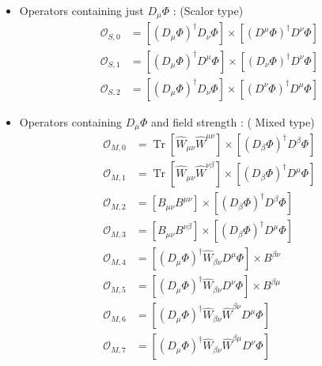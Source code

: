 \begin{itemize}
\item Operators containing just $D_\mu \Phi$ : (Scalor type)
\begin{equation}
\label{eq:OpratorFS}
\begin{aligned}
\mathcal{O}_{S, 0} &=\left[\left(D_{\mu} \Phi\right)^{\dagger} D_{\nu} \Phi\right] \times\left[\left(D^{\mu} \Phi\right)^{\dagger} D^{\nu} \Phi\right] \\
\mathcal{O}_{S, 1} &=\left[\left(D_{\mu} \Phi\right)^{\dagger} D^{\mu} \Phi\right] \times\left[\left(D_{\nu} \Phi\right)^{\dagger} D^{\nu} \Phi\right] \\
\mathcal{O}_{S, 2} &=\left[\left(D_{\mu} \Phi\right)^{\dagger} D_{\nu} \Phi\right] \times\left[\left(D^{\nu} \Phi\right)^{\dagger} D^{\mu} \Phi\right]
\end{aligned}
\end{equation}
\item Operators containing $D_\mu \Phi$ and field strength : ( Mixed type)
\begin{equation}
\label{eq:OpratorFM}
\begin{aligned}
\mathcal{O}_{M, 0} &=\operatorname{Tr}\left[\hat{W}_{\mu \nu} \hat{W}^{\mu \nu}\right] \times\left[\left(D_{\beta} \Phi\right)^{\dagger} D^{\beta} \Phi\right] \\
\mathcal{O}_{M, 1} &=\operatorname{Tr}\left[\hat{W}_{\mu \nu} \hat{W}^{\nu \beta}\right] \times\left[\left(D_{\beta} \Phi\right)^{\dagger} D^{\mu} \Phi\right] \\
\mathcal{O}_{M, 2} &=\left[B_{\mu \nu} B^{\mu \nu}\right] \times\left[\left(D_{\beta} \Phi\right)^{\dagger} D^{\beta} \Phi\right] \\
\mathcal{O}_{M, 3} &=\left[B_{\mu \nu} B^{\nu \beta}\right] \times\left[\left(D_{\beta} \Phi\right)^{\dagger} D^{\mu} \Phi\right] \\
\mathcal{O}_{M, 4} &=\left[\left(D_{\mu} \Phi\right)^{\dagger} \hat{W}_{\beta \nu} D^{\mu} \Phi\right] \times B^{\beta \nu} \\
\mathcal{O}_{M, 5} &=\left[\left(D_{\mu} \Phi\right)^{\dagger} \hat{W}_{\beta \nu} D^{\nu} \Phi\right] \times B^{\beta \mu} \\
\mathcal{O}_{M, 6} &=\left[\left(D_{\mu} \Phi\right)^{\dagger} \hat{W}_{\beta \nu} \hat{W}^{\beta \nu} D^{\mu} \Phi\right] \\
\mathcal{O}_{M, 7} &=\left[\left(D_{\mu} \Phi\right)^{\dagger} \hat{W}_{\beta \nu} \hat{W}^{\beta \mu} D^{\nu} \Phi\right]
\end{aligned} 

\end{equation}
\end{itemize}

